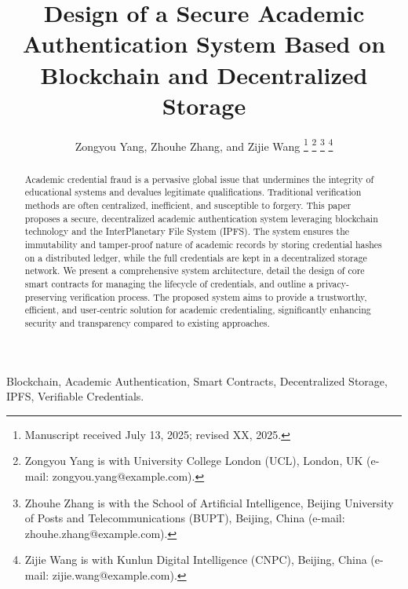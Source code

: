 \documentclass[lettersize,journal]{IEEEtran}
\begin{document}
\title{Design of a Secure Academic Authentication System Based on Blockchain and Decentralized Storage}

\author{Zongyou Yang, Zhouhe Zhang, and Zijie Wang
\thanks{Manuscript received July 13, 2025; revised XX, 2025.}
\thanks{Zongyou Yang is with University College London (UCL), London, UK (e-mail: zongyou.yang@example.com).}
\thanks{Zhouhe Zhang is with the School of Artificial Intelligence, Beijing University of Posts and Telecommunications (BUPT), Beijing, China (e-mail: zhouhe.zhang@example.com).}
\thanks{Zijie Wang is with Kunlun Digital Intelligence (CNPC), Beijing, China (e-mail: zijie.wang@example.com).}}


\maketitle

\begin{abstract}
Academic credential fraud is a pervasive global issue that undermines the integrity of educational systems and devalues legitimate qualifications. Traditional verification methods are often centralized, inefficient, and susceptible to forgery. This paper proposes a secure, decentralized academic authentication system leveraging blockchain technology and the InterPlanetary File System (IPFS). The system ensures the immutability and tamper-proof nature of academic records by storing credential hashes on a distributed ledger, while the full credentials are kept in a decentralized storage network. We present a comprehensive system architecture, detail the design of core smart contracts for managing the lifecycle of credentials, and outline a privacy-preserving verification process. The proposed system aims to provide a trustworthy, efficient, and user-centric solution for academic credentialing, significantly enhancing security and transparency compared to existing approaches.
\end{abstract}

\begin{IEEEkeywords}
Blockchain, Academic Authentication, Smart Contracts, Decentralized Storage, IPFS, Verifiable Credentials.
\end{IEEEkeywords}
\end{document}
